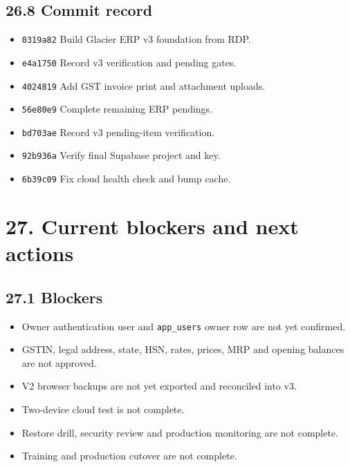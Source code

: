 \documentclass[11pt]{article}
\begin{document}
\subsection{26.8 Commit record}
\begin{itemize}[leftmargin=*,itemsep=2pt,topsep=2pt]
\item \texttt{0319a82} Build Glacier ERP v3 foundation from RDP.
\item \texttt{e4a1750} Record v3 verification and pending gates.
\item \texttt{4024819} Add GST invoice print and attachment uploads.
\item \texttt{56e80e9} Complete remaining ERP pendings.
\item \texttt{bd703ae} Record v3 pending-item verification.
\item \texttt{92b936a} Verify final Supabase project and key.
\item \texttt{6b39c09} Fix cloud health check and bump cache.
\end{itemize}
\clearpage
\section{27. Current blockers and next actions}
\subsection{27.1 Blockers}
\begin{itemize}[leftmargin=*,itemsep=2pt,topsep=2pt]
\item Owner authentication user and \texttt{app\_users} owner row are not yet confirmed.
\item GSTIN, legal address, state, HSN, rates, prices, MRP and opening balances are not approved.
\item V2 browser backups are not yet exported and reconciled into v3.
\item Two-device cloud test is not complete.
\item Restore drill, security review and production monitoring are not complete.
\item Training and production cutover are not complete.
\end{itemize}
\end{document}
